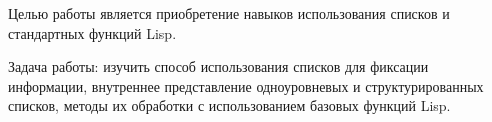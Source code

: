 
Целью работы является приобретение навыков использования списков и стандартных функций Lisp.

Задача работы: изучить способ использования списков для фиксации
информации, внутреннее представление одноуровневых и
структурированных списков, методы их обработки с использованием
базовых функций Lisp.

\clearpage
